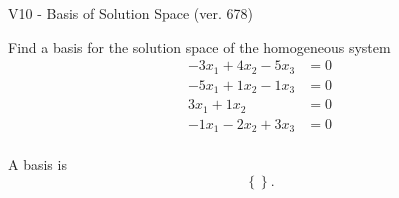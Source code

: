 \begin{exercise}
  \begin{exerciseTitle}V10 - Basis of Solution Space (ver. 678)\end{exerciseTitle}
  \begin{exerciseStatement}
    Find a basis for the solution space of the homogeneous system 
\begin{align*}
 -3 x_ 1 + 4 x_ 2 -5 x_ 3 &= 0  \\ 
  -5 x_ 1 + 1 x_ 2 -1 x_ 3 &= 0  \\ 
  3 x_ 1 + 1 x_ 2 &= 0  \\ 
  -1 x_ 1 -2 x_ 2 + 3 x_ 3 &= 0  \\ 
 \end{align*}


 
  \end{exerciseStatement}

  \begin{exerciseAnswer}
   A basis is   
\[\left\{\right\}.\]

  


  \end{exerciseAnswer}
\end{exercise}